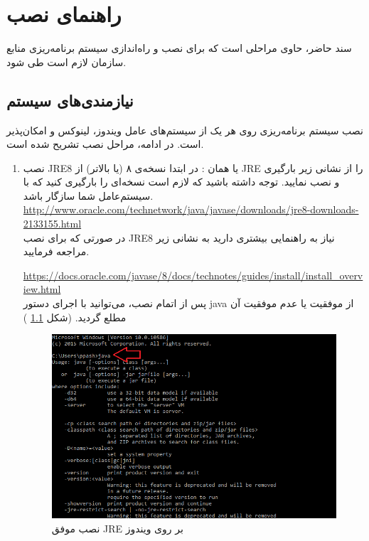 \chapter{راهنمای نصب}
سند حاضر،‌ حاوی مراحلی است که برای نصب و راه‌اندازی سیستم برنامه‌ریزی منابع سازمان لازم است طی شود.

\newpage
\section{نیازمندی‌های سیستم}
نصب سیستم برنامه‌ریزی روی هر یک از سیستم‌های عامل ویندوز، لینوکس و 
امکان‌پذیر است. در ادامه، مراحل نصب تشریح شده است.

\begin{enumerate}
	\item نصب JRE8 یا همان
	: در ابتدا نسخه‌ی ۸ (یا بالاتر) از JRE را از نشانی زیر بارگیری و نصب نمایید. توجه داشته باشید که لازم است نسخه‌ای را بارگیری کنید که با سیستم‌عامل شما سازگار باشد.\\
\url{http://www.oracle.com/technetwork/java/javase/downloads/jre8-downloads-2133155.html}\\
	
در صورتی که برای نصب JRE8 نیاز به راهنمایی بیشتری دارید به نشانی زیر مراجعه فرمایید.

\url{https://docs.oracle.com/javase/8/docs/technotes/guides/install/install_overview.html}\\

پس از اتمام نصب، می‌توانید با اجرای دستور java از موفقیت یا عدم موفقیت آن مطلع گردید. (شکل 
\ref{f12}
)

	\begin{figure}[H]
		\centering
		\includegraphics[scale=0.6]{img/install/java}
		\caption{نصب موفق JRE بر روی ویندوز}
		\label{f12}
	\end{figure}
	

\end{enumerate}
